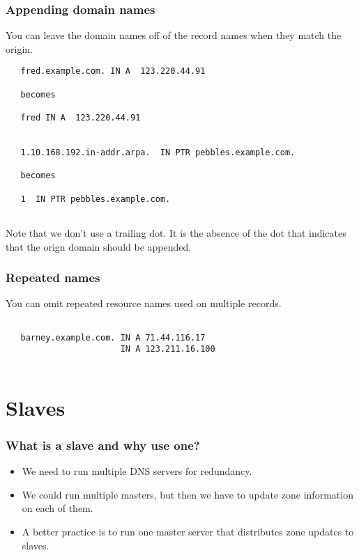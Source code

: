 \documentclass[10pt]{beamer}
\begin{document}
\begin{frame}[fragile]
  \frametitle{Appending domain names}

 You can leave the domain names off of the record names when they match the origin.

 \begin{verbatim}
   fred.example.com. IN A  123.220.44.91

   becomes

   fred IN A  123.220.44.91


   1.10.168.192.in-addr.arpa.  IN PTR pebbles.example.com.

   becomes

   1  IN PTR pebbles.example.com.
   
 \end{verbatim}
 
 Note that we don't use a trailing dot.  It is the absence of the dot that indicates that the 
 orign domain should be appended.
\end{frame}



\begin{frame}[fragile]
  \frametitle{Repeated names}

 You can omit repeated resource names used on multiple records.
 \begin{verbatim}
   
   barney.example.com. IN A 71.44.116.17
                       IN A 123.211.16.100
 
\end{verbatim}

\end{frame}



\section{Slaves}
\begin{frame}
	\frametitle{What is a slave and why use one?}
	
	\begin{itemize}
		\item We need to run multiple DNS servers for redundancy.
		\item We could run multiple masters, but then we have to update zone information on each of them.
		\item A better practice is to run one master server that distributes zone updates to slaves.
	\end{itemize}
\end{frame}
\end{document}
